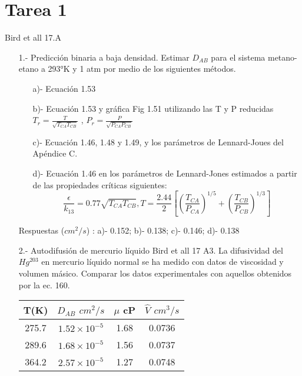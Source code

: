 \section{Tarea 1}
Bird et all 17.A
\begin{itemize}
\item[1.-] Predicción binaria a baja densidad. 
    Estimar $D_{AB}$  para el sistema metano-etano a 293°K y 1 atm por medio de los siguientes métodos.
    \begin{itemize}
        \item [a)-] Ecuación 1.53
        \item [b)-] Ecuación 1.53 y gráfica Fig 1.51 utilizando las T y P reducidas $T_{r}=\frac{T}{\sqrt{T_{CA}T_{CB}}}$ , $P_{r}=\frac{P}{\sqrt{P_{CA}P_{CB}}}$
        \item [c)-] Ecuación 1.46, 1.48 y 1.49, y los parámetros de Lennard-Joues del Apéndice C.
        \item [d)-] Ecuación 1.46 en los parámetros de Lennard-Jones estimados a partir de las propiedades críticas siguientes:
         $$\frac{\epsilon}{k_{13}}=0.77\sqrt{T_{CA}T_{CB}}  ,  T=\frac{2.44}{2} \left[ \left(\frac{T_{CA}}{P_{CA}}\right)^{1/5}+\left(\frac{T_{CB}}{P_{CB}}\right)^{1/3} \right] $$
    \end{itemize} 
    Respuestas ($cm^2/s$) : a)- 0.152; b)- 0.138; c)- 0.146; d)- 0.138
\item[2.-] Autodifusión de mercurio líquido Bird et all 17 A3.
La difusividad del $Hg^{203}$ en mercurio líquido normal se ha medido con datos de viscosidad y volumen másico. Comparar los datos experimentales con aquellos obtenidos 
por la ec. 160.
    \begin{table}[H]  %
    \centering  %
    \begin{tabular}{cccc}
    \hline
    \textbf{T(K)} & \textbf{$ D_{AB} $ $cm^2/s$} & \textbf{$\mu$ cP} & \textbf{$\hat{V}$ $cm^3/s$} \\ \hline
            275.7 & $1.52 \times 10^{-5}$ & 1.68 & 0.0736 \\ 
            289.6 & $1.68 \times 10^{-5}$ & 1.56 & 0.0737 \\ 
            364.2 & $2.57 \times 10^{-5}$ & 1.27 & 0.0748 \\ \hline
        \end{tabular}
    \end{table}  


\end{itemize}
